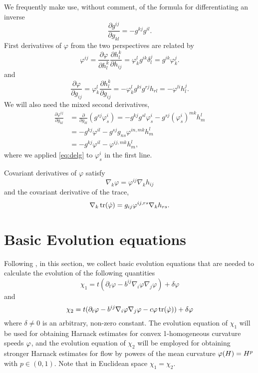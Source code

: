 \documentclass{amsart}
\begin{document}
We frequently make use, without comment, of the formula for differentiating an inverse
\[
\frac{\partial g^{ij}}{\partial g_{kl}} = - g^{kj} g^{il}.
\]
First derivatives of \(\varphi\) from the two perspectives are related by
\begin{equation}
\label{eq:delh}
\varphi^{ij} = \frac{\partial \varphi}{\partial h_l^k} \frac{\partial h_l^k}{\partial h_{ij}} = \varphi^l_k g^{ik} \delta^j_l = g^{ik} \varphi^j_k.
\end{equation}
and
\begin{equation}
\label{eq:delg}
\frac{\partial\varphi}{\partial g_{ij}} = \varphi^{l}_{k} \frac{\partial h^{k}_{l}}{\partial g_{ij}} = -\varphi^{l}_{k} g^{ki} g^{rj} h_{rl} = -\varphi^{li}h^{j}_{l}.
\end{equation}
We will also need the mixed second derivatives,
\begin{equation}
\label{eq:delhdelg}
\begin{split}
\frac{\partial \varphi^{ij}}{\partial g_{kl}} &= \frac{\partial}{\partial g_{kl}} \left(g^{sj} \varphi^{i}_{s} \right) = - g^{kj}g^{sl} \varphi^{i}_{s} - g^{sj} (\varphi^i_s)^{mk} h^l_m \\
&= - g^{kj} \varphi^{il} - g^{sj} g_{ns} \varphi^{in,mk} h^l_m \\
&= - g^{kj} \varphi^{il} - \varphi^{ij,mk} h^l_m,
\end{split}
\end{equation}
where we applied \cref{eq:delg} to \(\varphi^i_s\) in the first line.

Covariant derivatives of \(\varphi\) satisfy
\begin{equation}
\label{eq:delphi}
\nabla_k \varphi = \varphi^{ij} \nabla_k h_{ij}
\end{equation}
and the covariant derivative of the trace,
\begin{equation}
\label{eq:delPhi}
\nabla_k \operatorname{tr}(\dot{\varphi}) = g_{ij} \varphi^{ij,rs} \nabla_k h_{rs}.
\end{equation}

\section{Basic Evolution equations}
\label{sec:basic_evolution}

Following \cite{Andrews:09/1994, Chow:06/1991, Hamilton:/1995, Smoczyk:/1997}, in this section, we collect basic evolution equations that are needed to calculate the evolution of the following quantities
\[
\chi_1 =t(\partial_t \varphi- b^{ij} \nabla_i \varphi \nabla_j \varphi) +\delta\varphi
\]
and
\[
\chi_2 =t(\partial_t \varphi - b^{ij} \nabla_i \varphi \nabla_j \varphi - c \varphi \operatorname{tr}(\dot{\varphi})) +\delta\varphi
\]
where \(\delta \ne 0\) is an arbitrary, non-zero constant. The evolution equation of $\chi_1$ will be used for obtaining Harnack estimates for convex 1-homogeneous curvature speeds $\varphi$, and the evolution equation of $\chi_2$ will be employed for obtaining stronger Harnack estimates for flow by powers of the mean curvature $\varphi(H)=H^{p}$ with $p\in(0,1).$ Note that in Euclidean space $\chi_1=\chi_2.$
\end{document}
